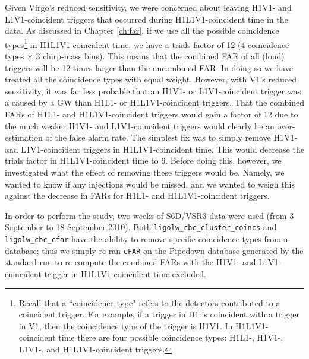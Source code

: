 Given Virgo's reduced sensitivity, we were concerned about leaving H1V1- and
L1V1-coincident triggers that occurred during H1L1V1-coincident time in the
data. As discussed in Chapter \ref{ch:far}, if we use all the possible
coincidence types\footnote{Recall that a ``coincidence type" refers to the
detectors contributed to a coincident trigger. For example, if a trigger in H1
is coincident with a trigger in V1, then the coincidence type of the trigger is
H1V1. In H1L1V1-coincident time there are four possible coincidence types:
H1L1-, H1V1-, L1V1-, and H1L1V1-coincident triggers.} in H1L1V1-coincident
time, we have a trials factor of 12 (4 coincidence types $\times$ 3 chirp-mass
bins). This means that the combined \ac{FAR} of all (loud) triggers will be 12
times larger than the uncombined \ac{FAR}. In doing so we have treated all the
coincidence types with equal weight. However, with V1's reduced sensitivity, it
was far less probable that an H1V1- or L1V1-coincident trigger was a caused by
a GW than H1L1- or H1L1V1-coincident triggers. That the combined \acp{FAR} of
H1L1- and H1L1V1-coincident triggers would gain a factor of 12 due to the much
weaker H1V1- and L1V1-coincident triggers would clearly be an over-estimation
of the false alarm rate. The simplest fix was to simply remove H1V1- and
L1V1-coincident triggers in H1L1V1-coincident time. This would decrease the
trials factor in H1L1V1-coincident time to 6. Before doing this, however, we
investigated what the effect of removing these triggers would be. Namely, we
wanted to know if any injections would be missed, and we wanted to weigh this
against the decrease in \acp{FAR} for H1L1- and H1L1V1-coincident triggers.

In order to perform the study, two weeks of S6D/VSR3 data were used (from 3
September to 18 September 2010). Both \verb|ligolw_cbc_cluster_coincs| and \\
\verb|ligolw_cbc_cfar| have the ability to remove specific coincidence types
from a database; thus we simply re-ran \texttt{cFAR} on the Pipedown database
generated by the standard run to re-compute the combined \acp{FAR} with the
H1V1- and L1V1-coincident trigger in H1L1V1-coincident time excluded. 


